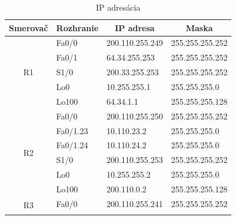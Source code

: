 \documentclass[12pt,twoside,a4paper]{report}
\begin{document}
\begin{table}[!htbp]
\centering
\caption{IP adresácia}
\label{tab:ip_adresacia}
\begin{tabular}{|c|l|l|l|}
\hline
\textbf{Smerovač}    & \multicolumn{1}{c|}{\textbf{Rozhranie}} & \multicolumn{1}{c|}{\textbf{IP adresa}} & \multicolumn{1}{c|}{\textbf{Maska}} \\ \hline
\multirow{5}{*}{R1}  & Fa0/0                                   & 200.110.255.249                         & 255.255.255.252                     \\ \cline{2-4} 
                     & Fa0/1                                   & 64.34.255.253                           & 255.255.255.252                     \\ \cline{2-4} 
                     & S1/0                                    & 200.33.255.253                          & 255.255.255.252                     \\ \cline{2-4} 
                     & Lo0                                     & 10.255.255.1                            & 255.255.255.0                       \\ \cline{2-4} 
                     & Lo100                                   & 64.34.1.1                               & 255.255.255.128                     \\ \hline
\multirow{6}{*}{R2}  & Fa0/0                                   & 200.110.255.250                         & 255.255.255.252                     \\ \cline{2-4} 
                     & Fa0/1.23                                & 10.110.23.2                             & 255.255.255.0                       \\ \cline{2-4} 
                     & Fa0/1.24                                & 10.110.24.2                             & 255.255.255.0                       \\ \cline{2-4} 
                     & S1/0                                    & 200.110.255.253                         & 255.255.255.252                     \\ \cline{2-4} 
                     & Lo0                                     & 10.255.255.2                            & 255.255.255.0                       \\ \cline{2-4} 
                     & Lo100                                   & 200.110.0.2                             & 255.255.255.128                     \\ \hline
\multirow{5}{*}{R3}  & Fa0/0                                   & 200.110.255.241                         & 255.255.255.252                     \\ \cline{2-4} 

\end{tabular}
\end{table}
\end{document}
